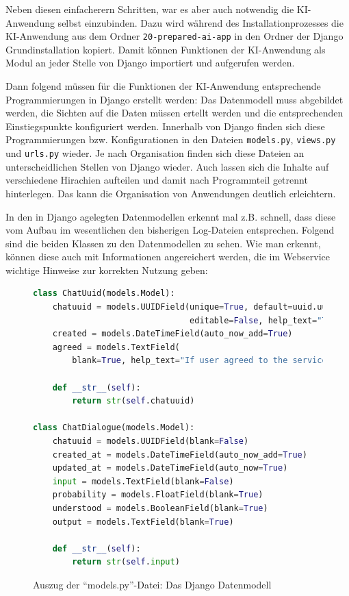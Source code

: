 \documentclass[12pt,oneside,titlepage,listof=totoc,bibliography=totoc]{scrartcl}
\newcommand{\code}[1]{\colorbox{code-gray}{\texttt{#1}}}
\begin{document}
Neben diesen einfacherern Schritten, war es aber auch notwendig die KI-Anwendung selbst einzubinden. Dazu wird während des Installationprozesses die KI-Anwendung aus dem Ordner \code{20-prepared-ai-app} in den Ordner der Django Grundinstallation kopiert. Damit können Funktionen der KI-Anwendung als Modul an jeder Stelle von Django importiert und aufgerufen werden. 

Dann folgend müssen für die Funktionen der KI-Anwendung entsprechende Programmierungen in Django erstellt werden: Das Datenmodell muss abgebildet werden, die Sichten auf die Daten müssen ertellt werden und die entsprechenden Einstiegspunkte konfiguriert werden. Innerhalb von Django finden sich diese Programmierungen bzw. Konfigurationen in den Dateien \code{models.py}, \code{views.py} und \code{urls.py} wieder. Je nach Organisation finden sich diese Dateien an unterscheidlichen Stellen von Django wieder. Auch lassen sich die Inhalte auf verschiedene Hirachien aufteilen und damit nach Programmteil getrennt hinterlegen. Das kann die Organisation von Anwendungen deutlich erleichtern.

In den in Django agelegten Datenmodellen erkennt mal z.B. schnell, dass diese vom Aufbau im wesentlichen den bisherigen Log-Dateien entsprechen. Folgend sind die beiden Klassen zu den Datenmodellen zu sehen. Wie man erkennt, können diese auch mit Informationen angereichert werden, die im Webservice wichtige Hinweise zur korrekten Nutzung geben:

\begin{figure}[H]
	\caption{Auszug der \enquote{models.py}-Datei: Das Django Datenmodell}
	\label{fig:code-django-data-modell}
\begin{lstlisting}[language=python]
class ChatUuid(models.Model):
    chatuuid = models.UUIDField(unique=True, default=uuid.uuid4,
                                editable=False, help_text="The UUID for a Chatbot conversation.")
    created = models.DateTimeField(auto_now_add=True)
    agreed = models.TextField(
        blank=True, help_text="If user agreed to the service terms (http://...), send 'Einverstanden'.")

    def __str__(self):
        return str(self.chatuuid)

class ChatDialogue(models.Model):
    chatuuid = models.UUIDField(blank=False)
    created_at = models.DateTimeField(auto_now_add=True)
    updated_at = models.DateTimeField(auto_now=True)
    input = models.TextField(blank=False)
    probability = models.FloatField(blank=True)
    understood = models.BooleanField(blank=True)
    output = models.TextField(blank=True)

    def __str__(self):
        return str(self.input)
\end{lstlisting}
\end{figure}
\end{document}

